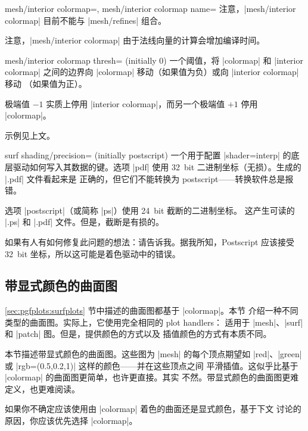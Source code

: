 {{\begin{pgfplotskeylist}{%
    mesh/interior colormap=,%
    mesh/interior colormap name=%
}
    注意，|mesh/interior colormap| 目前不能与 |mesh/refines| 组合。

    注意，|mesh/interior colormap| 由于法线向量的计算会增加编译时间。
\end{pgfplotskeylist}

\begin{pgfplotskey}{mesh/interior colormap thresh= (initially 0)}
    一个阈值，将 |colormap| 和 |interior colormap| 之间的边界向
    |colormap| 移动（如果值为负）或向 |interior colormap| 移动
    （如果值为正）。

    极端值 $-1$ 实质上停用 |interior colormap|，而另一个极端值 $+1$
    停用 |colormap|。

    示例见上文。
\end{pgfplotskey}
}

\begin{pgfplotskey}{surf shading/precision= (initially postscript)}
    一个用于配置 |shader=interp| 的底层驱动如何写入其数据的键。选项
    |pdf| 使用 32~bit 二进制坐标（无损）。生成的 |.pdf| 文件看起来是
    正确的，但它们不能转换为 postscript——转换软件总是报错。

    选项 |postscript|（或简称 |ps|）使用 24~bit 截断的二进制坐标。
    这产生可读的 |.ps| 和 |.pdf| 文件。但是，截断是有损的。

    如果有人有如何修复此问题的想法：请告诉我。据我所知，Postscript
    应该接受 32~bit 坐标，所以这可能是着色驱动中的错误。
\end{pgfplotskey}


\subsection{带显式颜色的曲面图}

{

\ref{sec:pgfplots:surfplots} 节中描述的曲面图都基于 |colormap|。本节
介绍一种不同类型的曲面图。实际上，它使用完全相同的 plot handlers：
适用于 |mesh|、|surf| 和 |patch| 图。但是，提供颜色的方式以及
\PGFPlots{} 插值颜色的方式有本质不同。

本节描述带显式颜色的曲面图。这些图为 |mesh| 的每个顶点期望如
|red|、|green| 或 |rgb=(0.5,0.2,1)| 这样的颜色——并在这些顶点之间
平滑插值。这似乎比基于 |colormap| 的曲面图更简单，也许更直接。其实
不然。带显式颜色的曲面图更难定义，也更难阅读。

如果你不确定应该使用由 |colormap| 着色的曲面还是显式颜色，基于下文
讨论的原因，你应该优先选择 |colormap|。

}}
